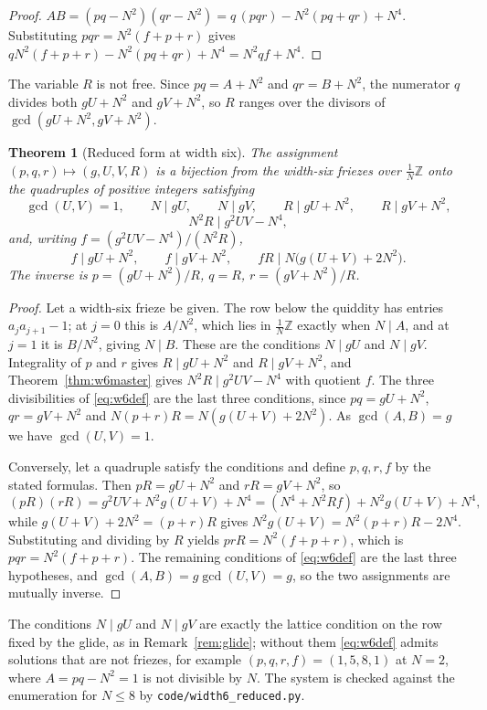 \documentclass[11pt]{article}
\theoremstyle{plain}
\newtheorem{theorem}{Theorem}[section]
\theoremstyle{definition}
\newcommand{\Z}{\mathbb{Z}}
\newcommand{\lat}{\tfrac{1}{N}\Z}
\begin{document}
\begin{proof}
$AB=(pq-N^2)(qr-N^2)=q\,(pqr)-N^2(pq+qr)+N^4$. Substituting $pqr=N^2(f+p+r)$ gives
$qN^2(f+p+r)-N^2(pq+qr)+N^4=N^2qf+N^4$.
\end{proof}

The variable $R$ is not free. Since $pq=A+N^2$ and $qr=B+N^2$, the numerator $q$ divides
both $gU+N^2$ and $gV+N^2$, so $R$ ranges over the divisors of $\gcd(gU+N^2,gV+N^2)$.

\begin{theorem}[Reduced form at width six]\label{thm:w6red}
The assignment $(p,q,r)\mapsto(g,U,V,R)$ is a bijection from the width-six friezes over
$\lat$ onto the quadruples of positive integers satisfying
\[
  \gcd(U,V)=1,\qquad N\mid gU,\qquad N\mid gV,\qquad R\mid gU+N^2,\qquad R\mid gV+N^2,
\]
\[
  N^2R\mid g^2UV-N^4,
\]
and, writing $f=(g^2UV-N^4)/(N^2R)$,
\[
  f\mid gU+N^2,\qquad f\mid gV+N^2,\qquad fR\mid N\bigl(g(U+V)+2N^2\bigr).
\]
The inverse is $p=(gU+N^2)/R$, $q=R$, $r=(gV+N^2)/R$.
\end{theorem}

\begin{proof}
Let a width-six frieze be given. The row below the quiddity has entries $a_ja_{j+1}-1$; at
$j=0$ this is $A/N^2$, which lies in $\lat$ exactly when $N\mid A$, and at $j=1$ it is
$B/N^2$, giving $N\mid B$. These are the conditions $N\mid gU$ and $N\mid gV$. Integrality
of $p$ and $r$ gives $R\mid gU+N^2$ and $R\mid gV+N^2$, and Theorem~\ref{thm:w6master}
gives $N^2R\mid g^2UV-N^4$ with quotient $f$. The three divisibilities of \eqref{eq:w6def}
are the last three conditions, since $pq=gU+N^2$, $qr=gV+N^2$ and
$N(p+r)R=N(g(U+V)+2N^2)$. As $\gcd(A,B)=g$ we have $\gcd(U,V)=1$.

Conversely, let a quadruple satisfy the conditions and define $p,q,r,f$ by the stated
formulas. Then $pR=gU+N^2$ and $rR=gV+N^2$, so
\[
  (pR)(rR)=g^2UV+N^2g(U+V)+N^4=(N^4+N^2Rf)+N^2g(U+V)+N^4 ,
\]
while $g(U+V)+2N^2=(p+r)R$ gives $N^2g(U+V)=N^2(p+r)R-2N^4$. Substituting and dividing by
$R$ yields $prR=N^2(f+p+r)$, which is $pqr=N^2(f+p+r)$. The remaining conditions of
\eqref{eq:w6def} are the last three hypotheses, and $\gcd(A,B)=g\gcd(U,V)=g$, so the two
assignments are mutually inverse.
\end{proof}

The conditions $N\mid gU$ and $N\mid gV$ are exactly the lattice condition on the row fixed
by the glide, as in Remark~\ref{rem:glide}; without them \eqref{eq:w6def} admits solutions
that are not friezes, for example $(p,q,r,f)=(1,5,8,1)$ at $N=2$, where $A=pq-N^2=1$ is
not divisible by $N$. The system is
checked against the enumeration for $N\le 8$ by \texttt{code/width6\_reduced.py}.
\end{document}
